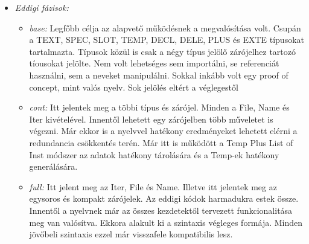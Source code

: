 {\begin{itemize}
\item \emph{Eddigi fázisok:}
\begin{itemize}
\item \emph{base:}
Legfőbb célja az alapvető működésnek a megvalósítása volt. 
Csupán a TEXT, SPEC, SLOT, TEMP, DECL, DELE, PLUS és EXTE típusokat tartalmazta.
Típusok közül is csak a négy típus jelölő zárójelhez tartozó tíousokat jelölte.
Nem volt lehetséges sem importálni, se referenciát használni, sem a neveket manipulálni.
Sokkal inkább volt egy proof of concept, mint valós nyelv. 
Sok jelölés eltért a véglegestől
\item \emph{cont:}
Itt jelentek meg a többi típus és zárójel.
Minden a File, Name és Iter kivételével.
Innentől lehetett egy zárójelben több műveletet is végezni.
Már ekkor is a nyelvvel hatékony eredményeket lehetett elérni a redundancia csökkentés terén.
Már itt is működött a Temp Plus List of Inst módszer az adatok hatékony tárolására és a Temp-ek
hatékony generálására.
\item \emph{full:}
Itt jelent meg az Iter, File és Name.
Illetve itt jelentek meg az egysoros és kompakt zárójelek.
Az eddigi kódok harmadukra estek össze.
Innentől a nyelvnek már az összes kezdetektől tervezett funkcionalitása meg van valósítva.
Ekkora alakult ki a szintaxis végleges formája.
Minden jövőbeli szintaxis ezzel már visszafele kompatibilis lesz.
\end{itemize}


\end{itemize}}
